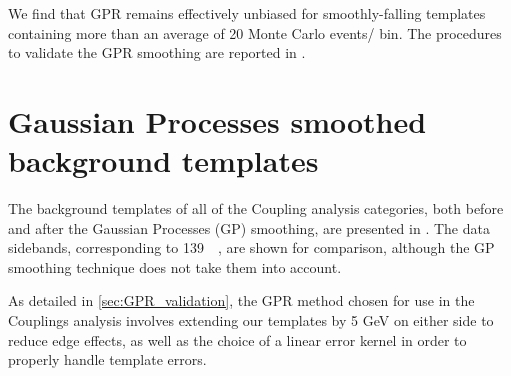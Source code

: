 We find that GPR remains effectively unbiased for smoothly-falling templates containing more than an average of 20 Monte Carlo events/ bin. The procedures to validate the GPR smoothing are reported in \App{\ref{sec:gpr_validation}}.

\section{Gaussian Processes smoothed background templates}
\label{sec:GPR_templates}

The background templates of all of the Coupling analysis categories, both before and after the Gaussian Processes (GP) smoothing, are presented in \Figrange{\ref{fig:gpr_coupcat_1}}{\ref{fig:gpr_coupcat_22}}. The data sidebands, corresponding to \SI{139}{\per\fb}, are shown for comparison, although the GP smoothing technique does not take them into account.

As detailed in \ref{sec:GPR_validation}, the GPR method chosen for use in the Couplings analysis involves extending our templates by 5 GeV on either side to reduce edge effects, as well as the choice of a linear error kernel in order to properly handle template errors.

